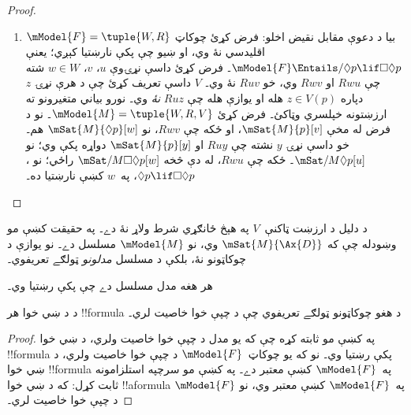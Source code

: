 \documentclass[../../../include/open-logic-section]{subfiles}
\begin{document}
\begin{proof}
\begin{enumerate}
    د~$V$ د تعريف له مخې، د هر هغه $z$ دپاره چې $Ruz$ وي
    $\mSat{M}{p}[z]$، نو $\mSat{M}{\Box p}[u]$۔ خو د فرض له
    مخې ، $\Box p \lif \Box \Box p$، په~$u$ کښې رښتيا
    ده؛ نو $\mSat{M}{\Box \Box p}[u]$۔ ځکه چې $Ruv$ او $Rvw$،
    نو $\mSat{M}{p}[w]$؛ خو د~$V$ د تعريف له مخې دا يوازې
    هله شونې ده چې $Ruw$ وي، لکه څنګه چې مو غوښتل۔
  \item بيا د دعوې مقابل نقيض اخلو: فرض کړئ چوکاټ
    $\mModel{F} = \tuple{W, R}$ اقليدسي نۀ وي، او ښيو چې
     پکې نارښتيا کېږي؛ يعنې
    $\mModel{F} \Entails/ \Diamond p \lif \Box\Diamond p$۔
    فرض کړئ داسې نړۍوې $u$، $v$، $w \in W$ شته چې $Rwu$ او
    $Rwv$ وي، خو $Ruv$ نۀ وي۔ $V$ داسې تعريف کړئ چې د هرې نړۍ
    $z$ دپاره $z \in V(p)$ هله او يوازې هله چې $Ruz$
    \emph{نۀ} وي۔ نورو بياني متغيرونو ته ارزښتونه خپلسري وټاکئ۔
    فرض کړئ $\mModel{M} =\tuple{W, R, V}$۔ نو د
    فرض له مخې $\mSat{M}{p}[v]$، او ځکه چې $Rwv$، نو
    $\mSat{M}{\Diamond p}[w]$ هم۔ خو داسې نړۍ $y$ نشته چې
    $Ruy$ او $\mSat{M}{p}[y]$ دواړه پکې وي؛ نو
    $\mSat/{M}{\Diamond p}[u]$۔ ځکه چې $Rwu$، له دې څخه
    $\mSat/{M}{\Box\Diamond p}[w]$ راځي؛ نو ،
    $\Diamond p \lif \Box\Diamond p$، په~$w$ کښې نارښتيا ده۔
  \end{enumerate}
\end{proof}

د  دليل د ارزښت ټاکنې~$V$ په هېڅ ځانګړي شرط ولاړ نۀ دے۔ په حقيقت کښې مو وښودله چې که
$\mSat{M}{\Ax{D}}$ وي، نو $\mModel{M}$ مسلسل دے۔ نو 
يوازې د چوکاټونو نۀ، بلکې د مسلسل \emph{مدلونو} ټولګے تعريفوي۔

\begin{cor}
  هر هغه مدل مسلسل دے چې  پکې رښتيا وي۔
\end{cor}

\begin{cor}
د  د ښي خوا هر !!{formula} د هغو چوکاټونو
ټولګے تعريفوي چې د چپې خوا خاصيت لري۔
\end{cor}

\begin{proof}
  په  کښې مو ثابته کړه چې که يو مدل
  د چپې خوا خاصيت ولري، د ښي خوا !!{formula} پکې رښتيا وي۔ نو که
  يو چوکاټ~$\mModel{F}$ د چپې خوا خاصيت ولري، د ښي خوا
  !!{formula} په~$\mModel{F}$ کښې معتبر دے۔ په
   کښې مو سرچپه استلزامونه ثابت کړل:
  که د ښي خوا !!a{formula} په~$\mModel{F}$ کښې معتبر وي، نو
  $\mModel{F}$ د چپې خوا خاصيت لري۔
\end{proof}
\end{document}
